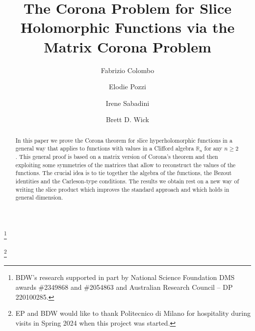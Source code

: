 \documentclass[11pt]{amsart}
\begin{document}
\title[The Matrix Corona Problem and Slice Holomorphic Functions]{The Corona Problem for Slice Holomorphic Functions via the Matrix Corona Problem}

\author[F. Colombo]{Fabrizio Colombo}
\address{(FC)
Politecnico di Milano\\Dipartimento di Matematica\\Via E. Bonardi 9\\20133
Milano, Italy}
%

\author[E. Pozzi]{Elodie Pozzi}
\address{(EP) Department of Mathematics and Statistics \\
Saint Louis University \\
220 N. Grand Blvd, 63103 St Louis MO, USA}
%


\author[I. Sabadini]{Irene Sabadini}
\address{(IS)
Politecnico di Milano\\Dipartimento di Matematica\\Via E. Bonardi 9\\20133
Milano, Italy
%
}

\author[B. D Wick]{Brett D. Wick}
\address{(BDW)  Department of Mathematics, Washington University -
 St. Louis, One Brookings Drive\\ St. Louis, MO USA 63130-4899}
%
\thanks{BDW's research supported in part by National Science Foundation DMS awards \#2349868 and \#2054863 and Australian Research Council -- DP 220100285.}

\thanks{EP and BDW would like to thank Politecnico di Milano for hospitality during visits in Spring 2024 when this project was started.}

\begin{abstract}
In this paper we prove the Corona theorem for slice hyperholomorphic functions in a general way that applies to functions with values in a Clifford algebra $\mathbb R_n$ for any $n\geq 2$. This general proof is based on a matrix version of Corona's theorem and then exploiting some symmetries of the matrices that allow to reconstruct the values of the functions. The crucial idea is to tie together the algebra of the functions, the Bezout identities and the Carleson-type conditions. The results we obtain rest on a new way of writing the slice product which improves the standard approach and which holds in general dimension.
\end{abstract}

\maketitle
\end{document}
